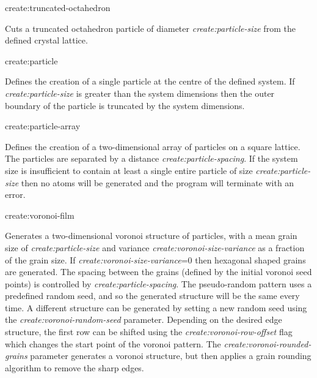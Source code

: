 {\zicf create:truncated-octahedron} Cuts a truncated octahedron particle of diameter \textit{create:particle-size} from the defined crystal lattice.


{\zicf create:particle} Defines the creation of a single particle at the centre of the defined system. If \textit{create:particle-size} is greater than the system dimensions then the outer boundary of the particle is truncated by the system dimensions.

{\zicf create:particle-array} Defines the creation of a two-dimensional array of particles on a square lattice. The particles are separated by a distance \textit{create:particle-spacing}. If the system size is insufficient to contain at least a single entire particle of size \textit{create:particle-size} then no atoms will be generated and the program will terminate with an error.


{\zicf create:voronoi-film} Generates a two-dimensional voronoi structure of particles, with a mean grain size of \textit{create:particle-size} and variance \textit{create:voronoi-size-variance} as a fraction of the grain size. If \textit{create:voronoi-size-variance}=0 then hexagonal shaped grains are generated. The spacing between the grains (defined by the initial voronoi seed points) is controlled by \textit{create:particle-spacing}. The pseudo-random pattern uses a predefined random seed, and so the generated structure will be the same every time. A different structure can be generated by setting a new random seed using the \textit{create:voronoi-random-seed} parameter. Depending on the desired edge structure, the first row can be shifted using the \textit{create:voronoi-row-offset} flag which changes the start point of the voronoi pattern. The \textit{create:voronoi-rounded-grains} parameter generates a voronoi structure, but then applies a grain rounding algorithm to remove the sharp edges.

